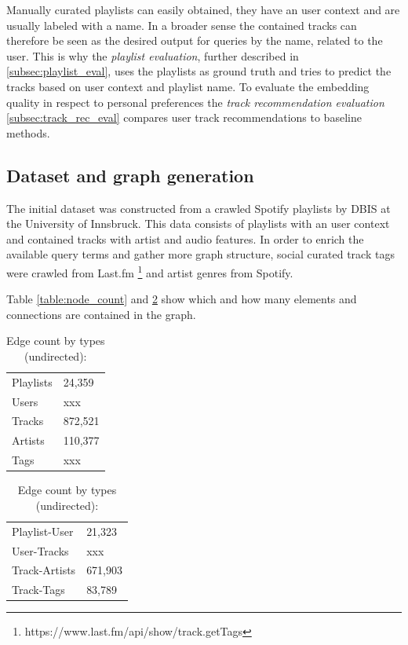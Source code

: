 \documentclass[a4paper]{llncs}
\begin{document}
	Manually curated playlists can easily obtained, they have an user context and are usually labeled with a name. In a broader sense the contained tracks can therefore be seen as the desired output for queries by the name, related to the user. This is why the \emph{playlist evaluation}, further described in \ref{subsec:playlist_eval}, uses the playlists as ground truth and tries to predict the tracks based on user context and playlist name. To evaluate the embedding quality in respect to personal preferences the \emph{track recommendation evaluation} \ref{subsec:track_rec_eval} compares user track recommendations to baseline methods.
	
	
	\subsection{Dataset and graph generation}
	The initial dataset was constructed from a crawled Spotify playlists by DBIS at the University of Innsbruck\cite{pichl2017improving}. This data consists of playlists with an user context and contained tracks with artist and audio features. In order to enrich the available query terms and gather more graph structure, social curated track tags were crawled from Last.fm \footnote{https://www.last.fm/api/show/track.getTags} and artist genres from Spotify.
	
	Table \ref{table:node_count} and \ref{table:edge_count} show which and how many elements and connections are contained in the graph.
	
	\begin{table}[H]
		\begin{minipage}{.5\textwidth}
			
			\centering
			\caption{Node count by type:}
			\label{table:node_count}
			\begin{tabular}{l|l}
				Playlists & 24,359  \\
				Users     & xxx     \\
				Tracks    & 872,521 \\
				Artists   & 110,377  \\
				Tags      & xxx
			\end{tabular}
			
		\end{minipage}
		\begin{minipage}{.5\textwidth}
			
			\centering
			\caption{Edge count by types (undirected):}
			\label{table:edge_count}
			\begin{tabular}{l|l}
				Playlist-User & 21,323  \\
				User-Tracks     & xxx     \\
				Track-Artists    & 671,903 \\
				Track-Tags   & 83,789
			\end{tabular}
			
		\end{minipage}
	\end{table}
	
\end{document}
